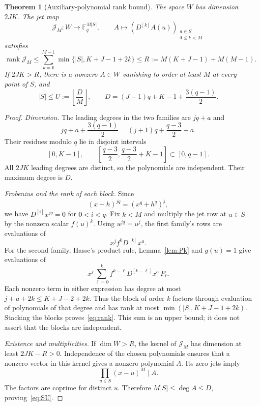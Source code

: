\documentclass[11pt]{amsart}
\newtheorem{theorem}{Theorem}[section]
\theoremstyle{definition}
\theoremstyle{remark}
\newcommand{\F}{\mathbb F}
\newcommand{\HD}[1]{D^{[#1]}}
\newcommand{\rank}{\operatorname{rank}}
\begin{document}
\begin{theorem}[Auxiliary-polynomial rank bound]\label{thm:rank}
The space $W$ has dimension $2JK$. The jet map
\[
\mathcal J_M:W\longrightarrow\F_q^{M|S|},\qquad
A\longmapsto(\HD{k}A(u))_{\substack{u\in S\\0\le k<M}}
\]
satisfies
\begin{equation}\label{eq:rank}
\rank\mathcal J_M
 \le\sum_{k=0}^{M-1}\min\{|S|,K+J-1+2k\}
 \le R:=M(K+J-1)+M(M-1).
\end{equation}
If $2JK>R$, there is a nonzero $A\in W$ vanishing to order at least $M$ at every point of $S$, and
\begin{equation}\label{eq:SU}
|S|\le U:=\left\lfloor\frac DM\right\rfloor,\qquad
D=(J-1)q+K-1+\frac{3(q-1)}2.
\end{equation}
\end{theorem}
\begin{proof}
\emph{Dimension.} The leading degrees in the two families are $jq+a$ and
\[
jq+a+\frac{3(q-1)}2=(j+1)q+\frac{q-3}{2}+a.
\]
Their residues modulo $q$ lie in disjoint intervals
\[
[0,K-1],\qquad
\left[\frac{q-3}{2},\frac{q-3}{2}+K-1\right]\subset[0,q-1].
\]
All $2JK$ leading degrees are distinct, so the polynomials are independent. Their maximum degree is $D$.

\emph{Frobenius and the rank of each block.} Since
\[
(x+h)^{jq}=(x^q+h^q)^j,
\]
we have $\HD{i}x^{jq}=0$ for $0<i<q$. Fix $k<M$ and multiply the jet row at $u\in S$ by the nonzero scalar $f(u)^k$. Using $u^{jq}=u^j$, the first family's rows are evaluations of
\[
x^jf^k\HD{k}x^a.
\]
For the second family, Hasse's product rule, Lemma~\ref{lem:Pk} and $g(u)=1$ give evaluations of
\[
x^j\sum_{\ell=0}^k f^{k-\ell}\HD{k-\ell}x^a\,P_\ell.
\]
Each nonzero term in either expression has degree at most $j+a+2k\le K+J-2+2k$. Thus the block of order $k$ factors through evaluation of polynomials of that degree and has rank at most $\min(|S|,K+J-1+2k)$. Stacking the blocks proves~\eqref{eq:rank}. This sum is an upper bound; it does not assert that the blocks are independent.

\emph{Existence and multiplicities.} If $\dim W>R$, the kernel of $\mathcal J_M$ has dimension at least $2JK-R>0$. Independence of the chosen polynomials ensures that a nonzero vector in this kernel gives a nonzero polynomial $A$. Its zero jets imply
\[
\prod_{u\in S}(x-u)^M\mid A.
\]
The factors are coprime for distinct $u$. Therefore $M|S|\le\deg A\le D$, proving~\eqref{eq:SU}.
\end{proof}
\end{document}

